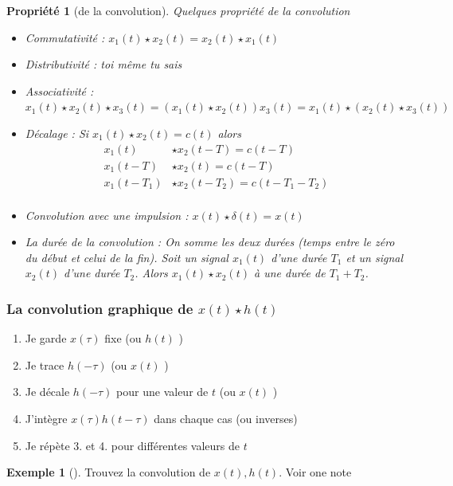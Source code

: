 \documentclass{article}
\theoremstyle{plain}%
\newtheorem{prop}[thm]{Propriété}
\theoremstyle{definition}
\newtheorem{exmp}{Exemple}[section]
\theoremstyle{remark}
\begin{document}
\begin{prop}[de la convolution]
    Quelques propriété de la convolution
    \begin{itemize}
        \item Commutativité : $ x_1(t) \star x_2(t) = x_2(t) \star x_1(t) $ 
        \item Distributivité : toi même tu sais
        \item Associativité : $ x_1(t) \star x_2(t) \star x_3(t) = (x_1(t) \star x_2(t)) x_3(t) = x_1(t) \star (x_2(t) \star x_3(t)) $ 
        \item Décalage : Si $ x_1(t) \star x_2(t) = c(t) $ alors \begin{align*}
            x_1(t) &\star x_2(t-T) = c(t-T) \\
            x_1(t-T) &\star x_2(t) = c(t-T) \\
            x_1(t-T_1) &\star x_2(t-T_2) = c(t-T_1 - T_2) \\
        \end{align*}
        \item Convolution avec une impulsion : $ x(t) \star \delta (t) = x(t) $ 
        \item La durée de la convolution : On somme les deux durées (temps entre le zéro du début et celui de la fin). Soit un signal $ x_1(t) $ d'une durée $ T_1 $ et un signal $ x_2(t) $ d'une durée $ T_2 $. Alors $ x_1(t) \star x_2(t) $ à une durée de $ T_1 + T_2 $. 
    \end{itemize}
\end{prop}

\subsubsection{La convolution graphique de $ x(t) \star h(t) $ }
\begin{enumerate}
    \item Je garde $ x(\tau ) $ fixe (ou $ h(t) $ )
    \item Je trace $ h(-\tau ) $ (ou $ x(t) $ )
    \item Je décale $ h(-\tau ) $ pour une valeur de $ t $ (ou $ x(t) $ )
    \item J'intègre $ x(\tau )h(t -\tau ) $ dans chaque cas (ou inverses)
    \item Je répète 3. et 4. pour différentes valeurs de $ t $ 
\end{enumerate}
\begin{exmp}[]
    Trouvez la convolution de $ x(t), h(t) $. Voir one note
\end{exmp}
\end{document}
